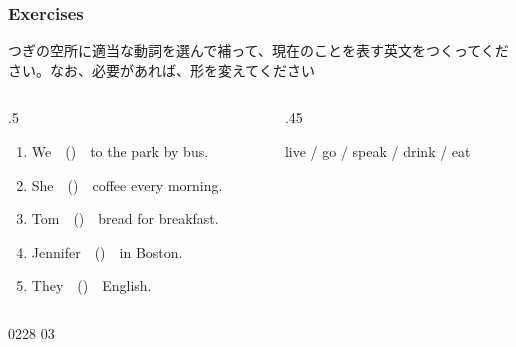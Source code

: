 \documentclass[aspectratio=169,xcolor={dvipsnames,table}]{beamer}
\newcommand{\myaudio}[1]{\href{#1}{\faVolumeUp}}
\begin{document}
\begin{frame}[plain,label=ex]\frametitle{Exercises}

{\small つぎの空所に適当な動詞を選んで補って、現在のことを表す英文をつくってください。なお、必要があれば、形を変えてください}

\bigskip

\begin{columns}
\begin{column}{.5\textwidth}
  \begin{enumerate}
   \item We~~()~~to the park by bus.
   \item  She~~()~~coffee every morning.
   \item Tom~~()~~bread for breakfast.
   \item Jennifer~~()~~in Boston.
   \item They~~()~~English.
  \end{enumerate}
\end{column}
\begin{column}{.45\textwidth}
\begin{tcolorbox}[title=この中から選んでください]
live / go / speak / drink / eat
\end{tcolorbox}
\end{column}
\end{columns}

\bigskip

\mbox{}\hfill{\tiny 0228}\,{\scriptsize \myaudio{audio/004_verb_03.mp3}\,03}

\end{frame}
\end{document}
